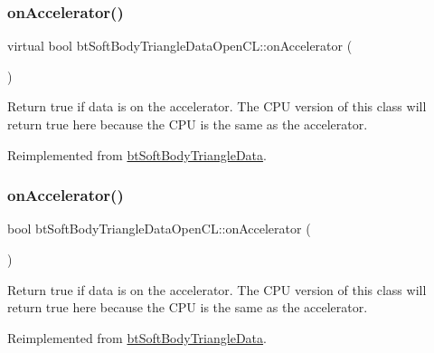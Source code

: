 \subsubsection{\texorpdfstring{on\+Accelerator()}{onAccelerator()}\hspace{0.1cm}{\footnotesize\ttfamily [1/2]}}
{\footnotesize\ttfamily virtual bool bt\+Soft\+Body\+Triangle\+Data\+Open\+C\+L\+::on\+Accelerator (\begin{DoxyParamCaption}{ }\end{DoxyParamCaption})\hspace{0.3cm}{\ttfamily [virtual]}}

Return true if data is on the accelerator. The C\+PU version of this class will return true here because the C\+PU is the same as the accelerator. 

Reimplemented from \hyperlink{classbtSoftBodyTriangleData_a7e461faee6801a25e4ccdf108d55ed54}{bt\+Soft\+Body\+Triangle\+Data}.

\mbox{\label{classbtSoftBodyTriangleDataOpenCL_ae6287090bdc3505f89d495ded41660e8}} 
\subsubsection{\texorpdfstring{on\+Accelerator()}{onAccelerator()}\hspace{0.1cm}{\footnotesize\ttfamily [2/2]}}
{\footnotesize\ttfamily bool bt\+Soft\+Body\+Triangle\+Data\+Open\+C\+L\+::on\+Accelerator (\begin{DoxyParamCaption}{ }\end{DoxyParamCaption})\hspace{0.3cm}{\ttfamily [virtual]}}

Return true if data is on the accelerator. The C\+PU version of this class will return true here because the C\+PU is the same as the accelerator. 

Reimplemented from \hyperlink{classbtSoftBodyTriangleData_a7e461faee6801a25e4ccdf108d55ed54}{bt\+Soft\+Body\+Triangle\+Data}.

\mbox{\label{classbtSoftBodyTriangleDataOpenCL_a2f1c39d19efd5df0fb191b6af632ecd6}} 
